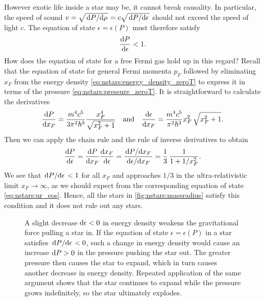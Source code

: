 However exotic life inside a star may be, it cannot break causality. 
In particular, the speed of sound $v = \sqrt{\odv{P}/{\rho}} = c \sqrt{\odv{P}/{\epsilon}}$ should not exceed the speed of light $c$.
The equation of state $\epsilon = \epsilon(P)$ must therefore satisfy
\begin{equation}
	\odv{P}{\epsilon} < 1 .
\end{equation}
How does the equation of state for a free Fermi gas hold up in this regard?
Recall that the equation of state for general Fermi momenta $p_F$ followed by eliminating $x_F$ from the energy density \eqref{eq:nstars:energy_density_zeroT} to express it in terms of the pressure \eqref{eq:nstars:pressure_zeroT}.
It is straightforward to calculate the derivatives
\begin{equation}
	\odv{P}{x_F} = \frac{m^4 c^5}{3 \pi^2 \hbar^3} \frac{x_F^4}{\sqrt{x_F^2 + 1}}
	\quad \text{and} \quad
	\odv{\epsilon}{x_F} = \frac{m^4 c^5}{\pi^2 \hbar^3} x_F^2 \, \sqrt{x_F^2 + 1} .
\end{equation}
Then we can apply the chain rule and the rule of inverse derivatives to obtain
\begin{equation}
	\odv{P}{\epsilon} = 
	\odv{P}{x_F} \odv{x_F}{\epsilon} =
	\frac{\odv{P}/{x_F}}{\odv{\epsilon}/{x_F}} =
	\frac13 \, \frac{1}{1+1/x_F^2}.
\end{equation}
We see that $\odv{P}/{\epsilon} < 1$ for all $x_F$ and approaches $1/3$ in the ultra-relativistic limit $x_F \rightarrow \infty$, as we should expect from the corresponding equation of state \eqref{eq:nstars:ur_eos}.
Hence, all the stars in \cref{fig:nstars:massradius} satisfy this condition and it does not rule out any stars.

\usetikzlibrary{arrows.meta}
\usetikzlibrary{shapes.symbols}
\begin{figure}
\caption{\label{fig:nstars:star_explosion}%
A slight decrease $\mathop{}\!\mathrm{d} \epsilon < 0$ in energy density weakens the gravitational force pulling a star in.
If the equation of state $\epsilon = \epsilon(P)$ in a star satisfies $\odv{P}/{\epsilon} < 0$, such a change in energy density would cause an increase $\mathop{}\!\mathrm{d} P > 0$ in the pressure pushing the star out.
The greater pressure then causes the star to expand, which in turn causes another decrease in energy density.
Repeated application of the same argument shows that the star continues to expand while the pressure grows indefinitely, so the star ultimately explodes.
}
\end{figure}

